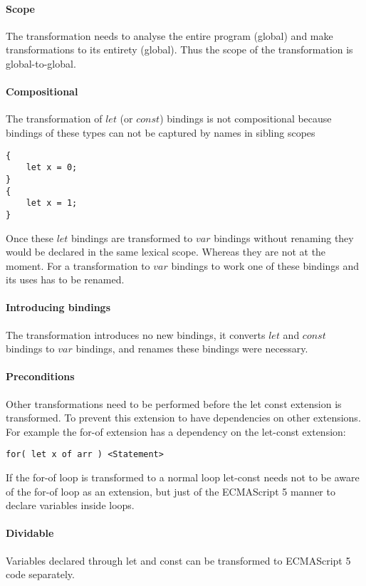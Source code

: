 \documentclass[10pt,a4paper]{article}
\begin{document}
\paragraph{Scope}
The transformation needs to analyse the entire program (global) and make transformations to its entirety (global). Thus the scope of the transformation is global-to-global.

\paragraph{Compositional}
The transformation of $let$ (or $const$) bindings is not compositional because bindings of these types can not be captured by names in sibling scopes

\begin{lstlisting}
{
	let x = 0;
}
{
	let x = 1;
}
\end{lstlisting} 

Once these $let$ bindings are transformed to $var$ bindings without renaming they would be declared in the same lexical scope. Whereas they are not at the moment. For a transformation to $var$ bindings to work one of these bindings and its uses has to be renamed.

\paragraph{Introducing bindings}
The transformation introduces no new bindings, it converts $let$ and $const$ bindings to $var$ bindings, and renames these bindings were necessary.

\paragraph{Preconditions}
Other transformations need to be performed before the let const extension is transformed. To prevent this extension to have dependencies on other extensions. For example the for-of extension has a dependency on the let-const extension:

\begin{lstlisting}
for( let x of arr ) <Statement>
\end{lstlisting}

If the for-of loop is transformed to a normal loop let-const needs not to be aware of the for-of loop as an extension, but just of the ECMAScript 5 manner to declare variables inside loops.

\paragraph{Dividable}
Variables declared through let and const can be transformed to ECMAScript 5 code separately.
\end{document}
